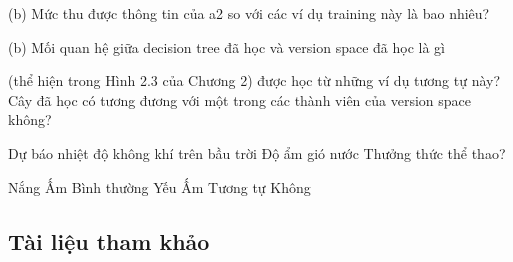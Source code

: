 (b) Mức thu được thông tin của a2 so với các ví dụ training này là bao nhiêu?

(b) Mối quan hệ giữa decision tree đã học và version space đã học là gì

(thể hiện trong Hình 2.3 của Chương 2) được học từ những ví dụ tương tự này? Cây đã học có tương đương với một trong các thành viên của version space không?

Dự báo nhiệt độ không khí trên bầu trời Độ ẩm gió nước Thưởng thức thể thao?

Nắng Ấm Bình thường Yếu Ấm Tương tự Không

\subsection{Tài liệu tham khảo}

